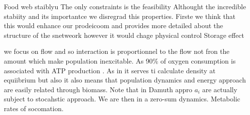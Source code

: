 Food web staiblyu The only constraints is the feasibility Althought the
incredible stabiity and its importantce we disregrad this properties.
Firste we think that this would enhance our prodeicoom and provides more
detailed about the structure of the snetweork however it would chage
physical control Storage effect

we focus on flow and so interaction is proportionnel to the flow not
fron the amount which make population inexcitable. As 90\% of oxygen
consumption is associated with ATP production \citet{White2013}. As in
\citet{Damuth2007} it serves ti calculate density at equiibrium but also
it also means that population dynamics and energy approach are easily
related through biomass. Note that in Damuth appro \(a_i\) are actually
subject to stocahstic approach. We are then in a zero-sum dynamics.
Metabolic rates of socomation.

